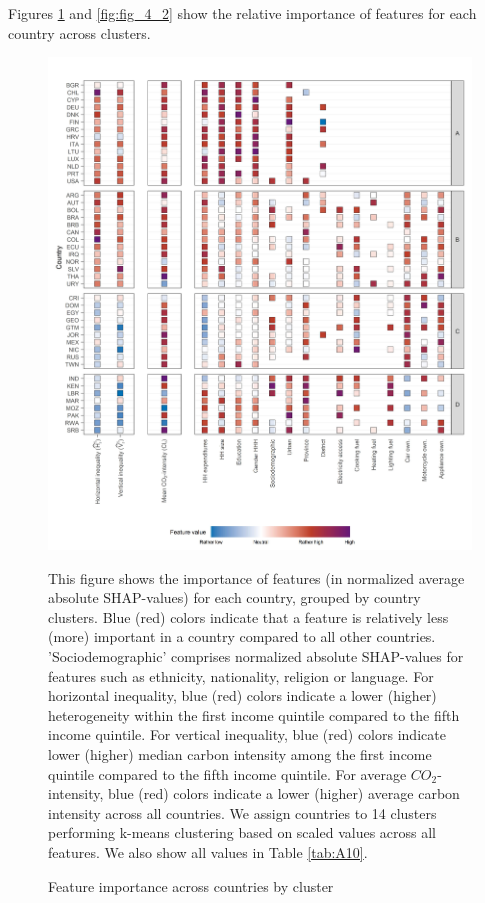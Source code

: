 \documentclass[12pt, a4paper]{article}
\newenvironment{subcaption}
{\strut
\vspace{-5pt}
\begin{minipage}[b]{0.9\textwidth}
  \hspace*{-\parindent}
  \footnotesize}
 {\end{minipage}}
\begin{document}
Figures \ref{fig:fig_4_1} and \ref{fig:fig_4_2} show the relative importance of features for each country across clusters. %

\begin{figure}[ht!]
    \centering
    \includegraphics{Figure 4/Figure_4_1}
    \caption{Feature importance across countries by cluster}
    \label{fig:fig_4_1}
    \begin{subcaption}
    This figure shows the importance of features (in normalized average absolute SHAP-values) for each country, grouped by country clusters. Blue (red) colors indicate that a feature is relatively less (more) important in a country compared to all other countries. 'Sociodemographic' comprises normalized absolute SHAP-values for features such as ethnicity, nationality, religion or language.
    For horizontal inequality, blue (red) colors indicate a lower (higher) heterogeneity within the first income quintile compared to the fifth income quintile. For vertical inequality, blue (red) colors indicate lower (higher) median carbon intensity among the first income quintile compared to the fifth income quintile. For average $CO_{2}$-intensity, blue (red) colors indicate a lower (higher) average carbon intensity across all countries.
    We assign countries to 14 clusters performing k-means clustering based on scaled values across all features. We also show all values in Table \ref{tab:A10}.
    \end{subcaption}
\end{figure}
\end{document}
